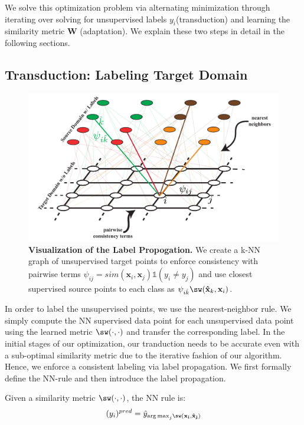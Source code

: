 We solve this optimization problem via alternating minimization through iterating over solving for unsupervised labels $y_i$(transduction) and learning the similarity metric $\mathbf{W}$ (adaptation). We explain these two steps in detail in the following sections.

 


\subsection{Transduction: Labeling Target Domain}
\label{label}
\begin{figure}[ht]
\centering
\includegraphics[width=0.75\columnwidth]{fig11}
\caption{\textbf{Visualization of the Label Propogation.} We create a k-NN graph of unsupervised target points to enforce consistency with pairwise terms 
\mbox{$\psi_{ij}=sim(\mathbf{x}_i, \mathbf{x}_j) \mathds{1}(y_i \neq y_j)$} and use closest supervised source points to each class as 
\mbox{$ \psi_{i\hat{k}} \sw(\mathbf{\hat{x}}_k,\mathbf{x}_{i})$}.} 
\label{vis_label_prop}
\end{figure}
In order to label the unsupervised points, we use the nearest-neighbor rule. We simply compute the NN supervised data point for each unsupervised data point using the learned metric $\sw(\cdot,\cdot)$ and transfer the corresponding label. In the initial stages of our optimization, our tranduction needs to be accurate even with a sub-optimal similarity metric due to the iterative fashion of our algorithm. Hence, we enforce a consistent labeling via label propagation. We first formally define the NN-rule and then introduce the label propagation.

Given a similarity metric $\sw(\cdot,\cdot)$, the NN rule is:
\begin{equation}
(y_i)^{pred} = \hat{y}_{{\arg\max}_j \sw(\mathbf{x_i}, \mathbf{\hat{x}_j})}
\end{equation}

